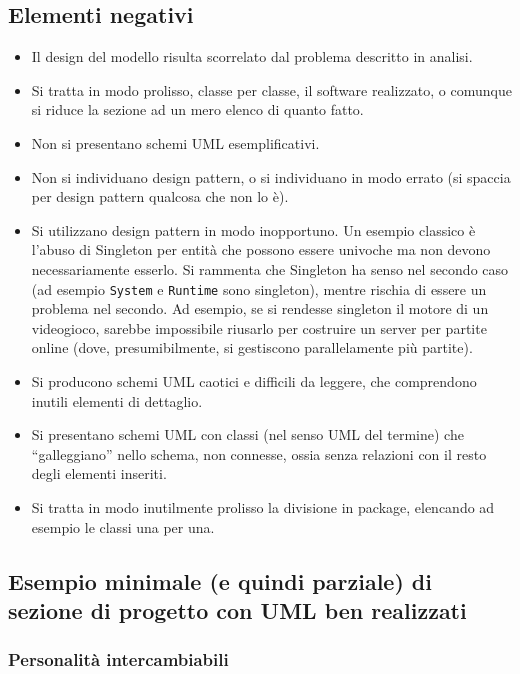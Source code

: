 \documentclass[a4paper,12pt]{report}
\begin{document}
\subsection*{Elementi negativi}
\begin{itemize}
	\item Il design del modello risulta scorrelato dal problema descritto in analisi.
	\item Si tratta in modo prolisso, classe per classe, il software realizzato, o comunque si riduce la sezione ad un mero elenco di quanto fatto.
	\item Non si presentano schemi UML esemplificativi.
	\item Non si individuano design pattern, o si individuano in modo errato (si spaccia per design pattern qualcosa che non lo è).
	\item Si utilizzano design pattern in modo inopportuno. Un esempio classico è l'abuso di
Singleton per entità che possono essere univoche ma non devono necessariamente esserlo. Si rammenta
che Singleton ha senso nel secondo caso (ad esempio \texttt{System} e \texttt{Runtime} sono
singleton), mentre rischia di essere un problema nel secondo. Ad esempio, se si rendesse singleton
il motore di un videogioco, sarebbe impossibile riusarlo per costruire un server per partite online
(dove, presumibilmente, si gestiscono parallelamente più partite).
	\item Si producono schemi UML caotici e difficili da leggere, che comprendono inutili elementi di dettaglio.
	\item Si presentano schemi UML con classi (nel senso UML del termine) che ``galleggiano'' nello schema, non connesse, ossia senza relazioni con il resto degli elementi inseriti.
	\item Si tratta in modo inutilmente prolisso la divisione in package, elencando ad esempio le classi una per una.
\end{itemize}

\subsection*{Esempio minimale (e quindi parziale) di sezione di progetto con UML ben realizzati}

\subsubsection{Personalità intercambiabili}
\end{document}
